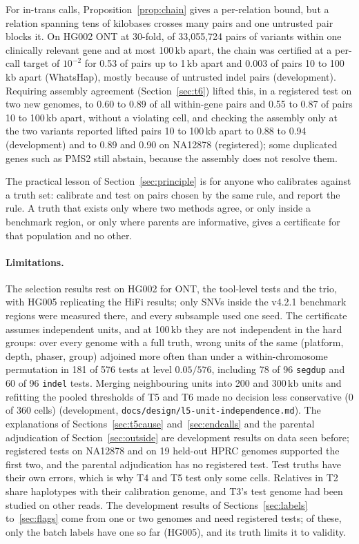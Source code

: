 \documentclass[11pt]{article}
\theoremstyle{definition}
\theoremstyle{remark}
\begin{document}
For in-trans calls, Proposition~\ref{prop:chain} gives a per-relation bound,
but a relation spanning tens of kilobases crosses many pairs and one
untrusted pair blocks it. On HG002 ONT at 30-fold, of 33{,}055{,}724 pairs of
variants within one clinically relevant gene and at most 100\,kb apart, the
chain was certified at a per-call target of $10^{-2}$ for 0.53 of pairs up to
1\,kb apart and 0.003 of pairs 10 to 100\,kb apart (WhatsHap), mostly because
of untrusted indel pairs (development). Requiring
assembly agreement (Section~\ref{sec:t6}) lifted this, in a registered test
on two new genomes, to 0.60 to 0.89 of all within-gene pairs and 0.55 to 0.87
of pairs 10 to 100\,kb apart, without a violating cell, and checking the
assembly only at the two variants reported lifted pairs 10 to 100\,kb apart
to 0.88 to 0.94 (development) and to 0.89 and 0.90 on NA12878 (registered); some duplicated genes such as PMS2 still
abstain, because the assembly does not resolve them.

The practical lesson of Section~\ref{sec:principle} is for anyone who
calibrates against a truth set: calibrate and test on pairs chosen by the
same rule, and report the rule. A truth that exists only where two methods
agree, or only inside a benchmark region, or only where parents are
informative, gives a certificate for that population and no other.

\paragraph{Limitations.} The selection results rest on HG002 for ONT, the
tool-level tests and the trio, with HG005 replicating the HiFi results; only
SNVs inside the v4.2.1 benchmark regions were measured there, and every
subsample used one seed. The certificate assumes independent units, and at
100\,kb they are not independent in the hard groups: over every genome with
a full truth, wrong units of the same (platform, depth, phaser, group)
adjoined more often than under a within-chromosome permutation in 181 of 576
tests at level $0.05/576$, including 78 of 96 \texttt{segdup} and 60 of 96
\texttt{indel} tests. Merging neighbouring units into 200 and 300\,kb units
and refitting the pooled thresholds of T5 and T6 made no decision less
conservative (0 of 360 cells) (development,
\nolinkurl{docs/design/l5-unit-independence.md}). The explanations of Sections~\ref{sec:t5cause}
and~\ref{sec:endcalls} and the parental adjudication of
Section~\ref{sec:outside} are development results on data seen before;
registered tests on NA12878 and on 19 held-out HPRC genomes supported the
first two, and the parental adjudication has no registered test. Test truths have their own errors, which is why T4
and T5 test only some cells. Relatives in T2 share haplotypes with their
calibration genome, and T3's test genome had been studied on other reads.
The development results of Sections~\ref{sec:labels} to~\ref{sec:flags}
come from one or two genomes and need registered tests; of these, only the
batch labels have one so far (HG005), and its truth limits it to validity.
\end{document}

